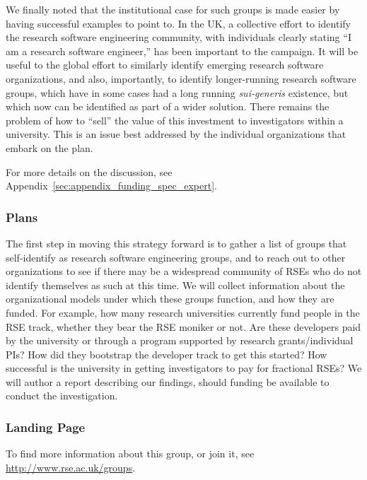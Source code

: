 We finally noted that the institutional case for such groups is made easier by
having successful examples to point to. In the UK, a collective effort to
identify the research software engineering community, with individuals clearly
stating ``I am a research software engineer,'' has been important to the
campaign. It will be useful to the global effort to similarly identify emerging
research software organizations, and also, importantly, to identify
longer-running research software groups, which have in some cases had a long
running \emph{sui-generis} existence, but which now can be identified as part of
a wider solution. There remains the problem of how to ``sell'' the value of this
investment to investigators within a university. This is an issue best
addressed by the individual organizations that embark on the plan.

For more details on the discussion, see Appendix~\ref{sec:appendix_funding_spec_expert}.

\subsubsection{Plans}

The first step in moving this strategy forward is to gather a list of groups
that self-identify as research software engineering groups, and to reach out to
other organizations to see if there may be a widespread community of RSEs who do
not identify themselves as such at this time. We will collect information about
the organizational models under which these groups function, and how they are
funded. For example, how many research universities currently fund people in the
RSE track, whether they bear the RSE moniker or not. Are these developers
paid by the university or through a program supported by research
grants/individual PIs? How did they bootstrap the developer track to get this
started? How successful is the university in getting investigators to pay for
fractional RSEs? We will author a report describing our findings, should funding
be available to conduct the investigation.

\subsubsection{Landing Page}

To find more information about this group, or join it, see \url{http://www.rse.ac.uk/groups}.
